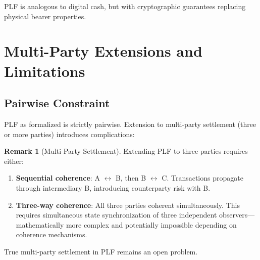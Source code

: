 \documentclass[twocolumn,10pt,a4paper]{article}
\theoremstyle{plain}
\theoremstyle{definition}
\newtheorem{remark}[theorem]{Remark}
\begin{document}
PLF is analogous to digital cash, but with cryptographic guarantees replacing physical bearer properties.

\section{Multi-Party Extensions and Limitations}
\label{sec:limitations}

\subsection{Pairwise Constraint}

PLF as formalized is strictly pairwise. Extension to multi-party settlement (three or more parties) introduces complications:

\begin{remark}[Multi-Party Settlement]
Extending PLF to three parties requires either:
\begin{enumerate}
\item \textbf{Sequential coherence}: A $\leftrightarrow$ B, then B $\leftrightarrow$ C. Transactions propagate through intermediary B, introducing counterparty risk with B.
\item \textbf{Three-way coherence}: All three parties coherent simultaneously. This requires simultaneous state synchronization of three independent observers—mathematically more complex and potentially impossible depending on coherence mechanisms.
\end{enumerate}
\end{remark}

True multi-party settlement in PLF remains an open problem.
\end{document}
